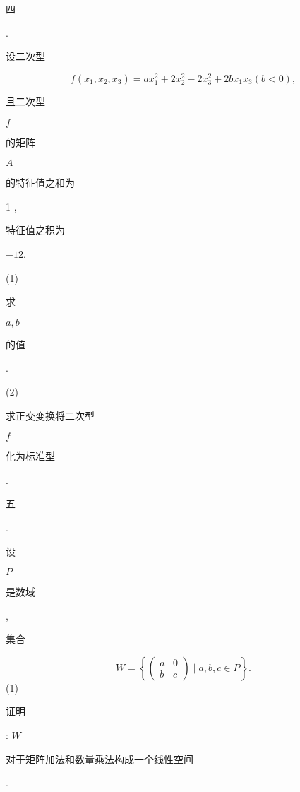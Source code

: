 \documentclass[10pt]{article}
\begin{document}
\begin{CJK}{UTF8}{mj}四\end{CJK}. \begin{CJK}{UTF8}{mj}设二次型\end{CJK}
$$
f\left(x_{1}, x_{2}, x_{3}\right)=a x_{1}^{2}+2 x_{2}^{2}-2 x_{3}^{2}+2 b x_{1} x_{3}(b<0),
$$
\begin{CJK}{UTF8}{mj}且二次型\end{CJK} $f$ \begin{CJK}{UTF8}{mj}的矩阵\end{CJK} $A$ \begin{CJK}{UTF8}{mj}的特征值之和为\end{CJK} 1 , \begin{CJK}{UTF8}{mj}特征值之积为\end{CJK} $-12$.

(1) \begin{CJK}{UTF8}{mj}求\end{CJK} $a, b$ \begin{CJK}{UTF8}{mj}的值\end{CJK}.

(2) \begin{CJK}{UTF8}{mj}求正交变换将二次型\end{CJK} $f$ \begin{CJK}{UTF8}{mj}化为标准型\end{CJK}.

\begin{CJK}{UTF8}{mj}五\end{CJK}. \begin{CJK}{UTF8}{mj}设\end{CJK} $P$ \begin{CJK}{UTF8}{mj}是数域\end{CJK}, \begin{CJK}{UTF8}{mj}集合\end{CJK}
$$
W=\left\{\left(\begin{array}{ll}
a & 0 \\
b & c
\end{array}\right) \mid a, b, c \in P\right\} .
$$
(1) \begin{CJK}{UTF8}{mj}证明\end{CJK}: $W$ \begin{CJK}{UTF8}{mj}对于矩阵加法和数量乘法构成一个线性空间\end{CJK}.
\end{document}

